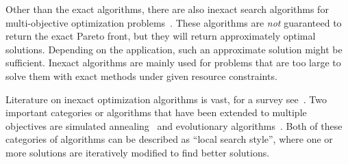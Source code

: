 Other than the exact algorithms, there are also inexact search algorithms for multi-objective optimization problems~\autocite{Saini2021}.
These algorithms are \emph{not} guaranteed to return the exact Pareto front, but they will return approximately optimal solutions.
Depending on the application, such an approximate solution might be sufficient.
Inexact algorithms are mainly used for problems that are too large to solve them with exact methods under given resource constraints.

Literature on inexact optimization algorithms is vast, for a survey see~\autocite{Saini2021}.
Two important categories or algorithms that have been extended to multiple objectives are simulated annealing~\autocites{DBLP:journals/science/KirkpatrickGV83,DBLP:journals/tec/BandyopadhyaySMD08,DBLP:journals/isci/SenguptaS18} and evolutionary algorithms~\autocites{DBLP:books/daglib/0087893,DBLP:journals/jgo/StornP97,DBLP:journals/tec/DebAPM02}.
Both of these categories of algorithms can be described as ``local search style'', where one or more solutions are iteratively modified to find better solutions.